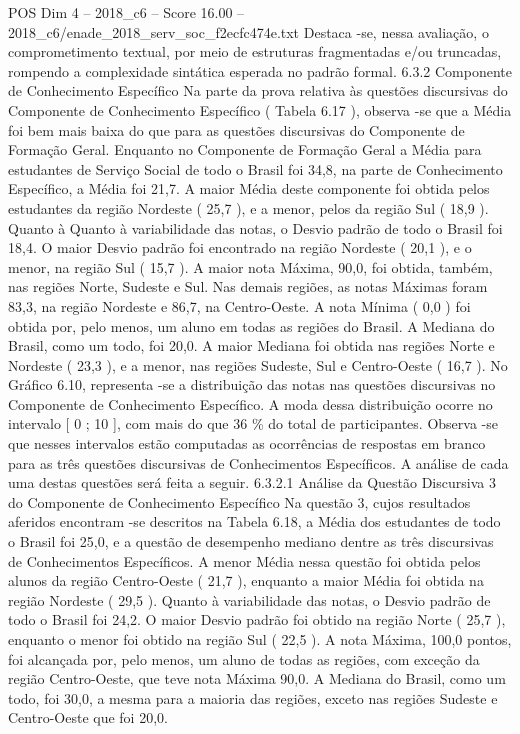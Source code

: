\begin{textsample}{POS Dim 4 – 2018\_c6 – Score 16.00 – 2018\_c6/enade\_2018\_serv\_soc\_f2ecfc474e.txt}
Destaca -se, nessa avaliação, o comprometimento textual, por meio de estruturas fragmentadas e/ou truncadas, rompendo a complexidade sintática esperada no padrão formal. 6.3.2 Componente de Conhecimento Específico Na parte da prova relativa às questões discursivas do Componente de Conhecimento Específico ( Tabela 6.17 ), observa -se que a Média foi bem mais baixa do que para as questões discursivas do Componente de Formação Geral.
Enquanto no Componente de Formação Geral a Média para estudantes de Serviço Social de todo o Brasil foi 34,8, na parte de Conhecimento Específico, a Média foi 21,7.
A maior Média deste componente foi obtida pelos estudantes da região Nordeste ( 25,7 ), e a menor, pelos da região Sul ( 18,9 ).
Quanto à Quanto à variabilidade das notas, o Desvio padrão de todo o Brasil foi 18,4.
O maior Desvio padrão foi encontrado na região Nordeste ( 20,1 ), e o menor, na região Sul ( 15,7 ).
A maior nota Máxima, 90,0, foi obtida, também, nas regiões Norte, Sudeste e Sul.
Nas demais regiões, as notas Máximas foram 83,3, na região Nordeste e 86,7, na Centro-Oeste.
A nota Mínima ( 0,0 ) foi obtida por, pelo menos, um aluno em todas as regiões do Brasil.
A Mediana do Brasil, como um todo, foi 20,0.
A maior Mediana foi obtida nas regiões Norte e Nordeste ( 23,3 ), e a menor, nas regiões Sudeste, Sul e Centro-Oeste ( 16,7 ).
No Gráfico 6.10, representa -se a distribuição das notas nas questões discursivas no Componente de Conhecimento Específico.
A moda dessa distribuição ocorre no intervalo [ 0 ; 10 ], com mais do que 36 \% do total de participantes.
Observa -se que nesses intervalos estão computadas as ocorrências de respostas em branco para as três questões discursivas de Conhecimentos Específicos.
A análise de cada uma destas questões será feita a seguir. 6.3.2.1 Análise da Questão Discursiva 3 do Componente de Conhecimento Específico Na questão 3, cujos resultados aferidos encontram -se descritos na Tabela 6.18, a Média dos estudantes de todo o Brasil foi 25,0, e a questão de desempenho mediano dentre as três discursivas de Conhecimentos Específicos.
A menor Média nessa questão foi obtida pelos alunos da região Centro-Oeste ( 21,7 ), enquanto a maior Média foi obtida na região Nordeste ( 29,5 ).
Quanto à variabilidade das notas, o Desvio padrão de todo o Brasil foi 24,2.
O maior Desvio padrão foi obtido na região Norte ( 25,7 ), enquanto o menor foi obtido na região Sul ( 22,5 ).
A nota Máxima, 100,0 pontos, foi alcançada por, pelo menos, um aluno de todas as regiões, com exceção da região Centro-Oeste, que teve nota Máxima 90,0.
A Mediana do Brasil, como um todo, foi 30,0, a mesma para a maioria das regiões, exceto nas regiões Sudeste e Centro-Oeste que foi 20,0.

\end{textsample}
